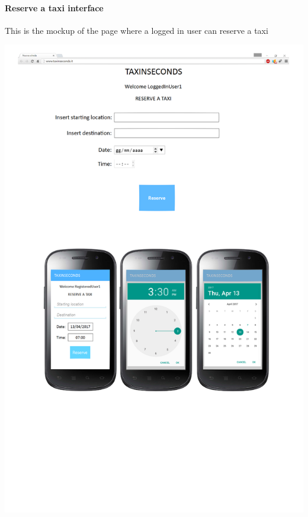 \documentclass{article}
\begin{document}
\paragraph{Reserve a taxi interface}
This is the mockup of the page where a logged in user can reserve a taxi\\
\begin{center}
	\includegraphics[width=.9\textwidth,height=.9\textheight,keepaspectratio]{ReserveTaxi}
\end{center}
\clearpage
\end{document}
